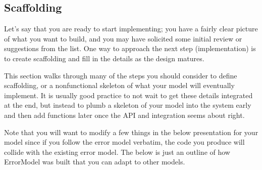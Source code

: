 \documentclass[letterpaper,10pt,english]{sphinxmanual}
\begin{document}
\begin{sphinxVerbatim}[commandchars=\\\{\}]
    
   
    
      
      
     
     
      
      
     
\end{sphinxVerbatim}


\subsection{Scaffolding}
\label{\detokenize{new-models:scaffolding}}
Let’s say that you are ready to start implementing; you have a fairly clear
picture of what you want to build, and you may have solicited some initial
review or suggestions from the list.  One way to approach the next step
(implementation) is to create scaffolding and fill in the details as the design
matures.

This section walks through many of the steps you should consider to define
scaffolding, or a non\sphinxhyphen{}functional skeleton of what your model will eventually
implement. It is usually good practice to not wait to get these details
integrated at the end, but instead to plumb a skeleton of your model into the
system early and then add functions later once the API and integration seems
about right.

Note that you will want to modify a few things in the below presentation for
your model since if you follow the error model verbatim, the code you produce
will collide with the existing error model. The below is just an outline of how
ErrorModel was built that you can adapt to other models.
\end{document}

